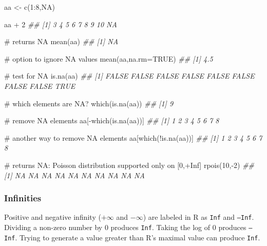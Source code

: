 \documentclass[
  13,
  letterpaper,
]{report}
\newenvironment{Shaded}{\begin{snugshade}}{\end{snugshade}}
\newcommand{\AttributeTok}[1]{\textcolor[rgb]{0.40,0.45,0.13}{#1}}
\newcommand{\CommentTok}[1]{\textcolor[rgb]{0.37,0.37,0.37}{#1}}
\newcommand{\ConstantTok}[1]{\textcolor[rgb]{0.56,0.35,0.01}{#1}}
\newcommand{\DecValTok}[1]{\textcolor[rgb]{0.68,0.00,0.00}{#1}}
\newcommand{\DocumentationTok}[1]{\textcolor[rgb]{0.37,0.37,0.37}{\textit{#1}}}
\newcommand{\FunctionTok}[1]{\textcolor[rgb]{0.28,0.35,0.67}{#1}}
\newcommand{\NormalTok}[1]{\textcolor[rgb]{0.00,0.23,0.31}{#1}}
\newcommand{\OtherTok}[1]{\textcolor[rgb]{0.00,0.23,0.31}{#1}}
\newcommand{\SpecialCharTok}[1]{\textcolor[rgb]{0.37,0.37,0.37}{#1}}
\begin{document}
\begin{Shaded}
\begin{Highlighting}[]
\NormalTok{aa }\OtherTok{\textless{}{-}} \FunctionTok{c}\NormalTok{(}\DecValTok{1}\SpecialCharTok{:}\DecValTok{8}\NormalTok{,}\ConstantTok{NA}\NormalTok{)}

\NormalTok{aa }\SpecialCharTok{+} \DecValTok{2}
\DocumentationTok{\#\# [1]  3  4  5  6  7  8  9 10 NA}

\CommentTok{\# returns NA}
\FunctionTok{mean}\NormalTok{(aa)}
\DocumentationTok{\#\# [1] NA}

\CommentTok{\# option to ignore NA values}
\FunctionTok{mean}\NormalTok{(aa,}\AttributeTok{na.rm=}\ConstantTok{TRUE}\NormalTok{)      }
\DocumentationTok{\#\# [1] 4.5}

\CommentTok{\# test for NA}
\FunctionTok{is.na}\NormalTok{(aa)               }
\DocumentationTok{\#\# [1] FALSE FALSE FALSE FALSE FALSE FALSE FALSE FALSE  TRUE}

\CommentTok{\# which elements are NA?}
\FunctionTok{which}\NormalTok{(}\FunctionTok{is.na}\NormalTok{(aa))        }
\DocumentationTok{\#\# [1] 9}

\CommentTok{\# remove NA elements}
\NormalTok{aa[}\SpecialCharTok{{-}}\FunctionTok{which}\NormalTok{(}\FunctionTok{is.na}\NormalTok{(aa))]   }
\DocumentationTok{\#\# [1] 1 2 3 4 5 6 7 8}

\CommentTok{\# another way to remove NA elements}
\NormalTok{aa[}\FunctionTok{which}\NormalTok{(}\SpecialCharTok{!}\FunctionTok{is.na}\NormalTok{(aa))]   }
\DocumentationTok{\#\# [1] 1 2 3 4 5 6 7 8}

\CommentTok{\# returns NA: Poisson distribution supported only on [0,+Inf]}
\FunctionTok{rpois}\NormalTok{(}\DecValTok{10}\NormalTok{,}\SpecialCharTok{{-}}\DecValTok{2}\NormalTok{) }
\DocumentationTok{\#\#  [1] NA NA NA NA NA NA NA NA NA NA}
\end{Highlighting}
\end{Shaded}

\subsubsection{Infinities}\label{sec-03-type-spec-inf}

Positive and negative infinity (\(+\infty\) and \(-\infty\)) are labeled
in R as \texttt{Inf} and \texttt{–Inf}. Dividing a non-zero number by 0
produces \texttt{Inf}. Taking the log of 0 produces \texttt{–Inf}.
Trying to generate a value greater than R's maximal value can produce
\texttt{Inf}.
\end{document}
